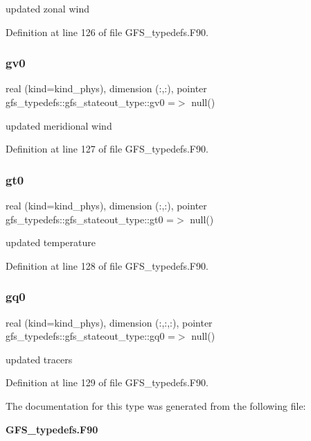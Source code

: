 updated zonal wind 



Definition at line 126 of file G\+F\+S\+\_\+typedefs.\+F90.

\mbox{\label{structgfs__typedefs_1_1gfs__stateout__type_a4a69f8131f7a0dd12cca600e82e1ad9d}} 
\subsubsection{gv0}
{\footnotesize\ttfamily real (kind=kind\+\_\+phys), dimension (\+:,\+:), pointer gfs\+\_\+typedefs\+::gfs\+\_\+stateout\+\_\+type\+::gv0 =$>$ null()}



updated meridional wind 



Definition at line 127 of file G\+F\+S\+\_\+typedefs.\+F90.

\mbox{\label{structgfs__typedefs_1_1gfs__stateout__type_a273998956eb588cbbb2c422e740840bb}} 
\subsubsection{gt0}
{\footnotesize\ttfamily real (kind=kind\+\_\+phys), dimension (\+:,\+:), pointer gfs\+\_\+typedefs\+::gfs\+\_\+stateout\+\_\+type\+::gt0 =$>$ null()}



updated temperature 



Definition at line 128 of file G\+F\+S\+\_\+typedefs.\+F90.

\mbox{\label{structgfs__typedefs_1_1gfs__stateout__type_a1adc136350f8cbfd0fb9b3cb485e3d94}} 
\subsubsection{gq0}
{\footnotesize\ttfamily real (kind=kind\+\_\+phys), dimension (\+:,\+:,\+:), pointer gfs\+\_\+typedefs\+::gfs\+\_\+stateout\+\_\+type\+::gq0 =$>$ null()}



updated tracers 



Definition at line 129 of file G\+F\+S\+\_\+typedefs.\+F90.



The documentation for this type was generated from the following file\+:\begin{DoxyCompactItemize}
\item 
\textbf{ G\+F\+S\+\_\+typedefs.\+F90}\end{DoxyCompactItemize}
